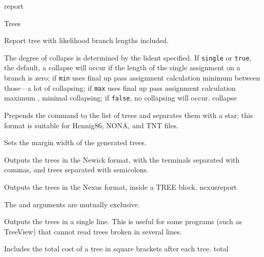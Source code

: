 \begin{command}{report}{}
\begin{arguments}
\begin{argumentgroup}{Trees}
{\begin{description}


{Report tree with likelihood branch lengths included. }
{}

%

{The degree of collapse is determined by the lident specified. 
If \texttt{single} or \texttt{true}, the default, a collapse will 
occur if the length of the single assignment on a branch is zero; 
if \texttt{min} uses final up pass assignment calculation minimum 
between those---a lot of collapsing; if \texttt{max} uses final up 
pass assignment calculation maximum , minimal collapsing; 
if \texttt{false}, no collapsing will occur.}
{collapse}

{Prepends the  command to the list of
trees and separates them with a star; this format is
suitable for Hennig86, NONA, and TNT files.}
{}

{Sets the margin width of the generated trees.}
{}

{Outputs the trees in the Newick format, with the
terminals separated with commas, and trees separated
with semicolons.}
{}

{Outputs the trees in the Nexus format, inside a TREE block.}
{nexusreport}

\begin{statement}
The  and  arguments are 
mutually exclusive.
\end{statement}


{Outputs the trees in a single line. This is useful for
some programs (such as TreeView) that cannot read
trees broken in several
lines.}
{}

{Includes the total cost of a tree in square brackets after each tree.}
{total}


\end{description}}
\end{argumentgroup}
\end{arguments}
\end{command}
